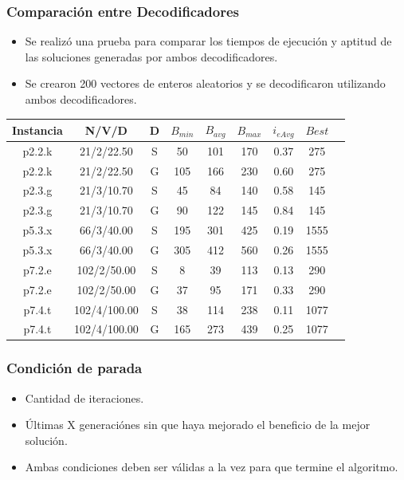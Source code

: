 \documentclass{beamer}
\begin{document}
\begin{frame}
\frametitle{Comparación entre Decodificadores}

\begin{itemize}
    \item Se realizó una prueba para comparar los tiempos de ejecución y aptitud de las soluciones generadas por ambos decodificadores.
    \pause
    \item Se crearon 200 vectores de enteros aleatorios y se decodificaron utilizando ambos decodificadores.
    \pause
\end{itemize}

\begin{table}
\begin{center}
\begin{tabular}{ |c|c|c|c|c|c|c|c|c| } 
\hline
Instancia & N/V/D & D & $B_{min}$ & $B_{avg}$ & $B_{max}$ & $i_{eAvg}$ & $Best$ \\
\hline
p2.2.k & 21/2/22.50 & S & 50 & 101 & 170 & 0.37 & 275 \\
p2.2.k & 21/2/22.50 & G & 105 & 166 & 230 & 0.60 & 275 \\
p2.3.g & 21/3/10.70 & S & 45 & 84 & 140 & 0.58 & 145 \\
p2.3.g & 21/3/10.70 & G & 90 & 122 & 145 & 0.84 & 145 \\
p5.3.x & 66/3/40.00 & S & 195 & 301 & 425 & 0.19 & 1555 \\
p5.3.x & 66/3/40.00 & G & 305 & 412 & 560 & 0.26 & 1555 \\
p7.2.e & 102/2/50.00 & S & 8 & 39 & 113 & 0.13 & 290 \\
p7.2.e & 102/2/50.00 & G & 37 & 95 & 171 & 0.33 & 290 \\
p7.4.t & 102/4/100.00 & S & 38 & 114 & 238 & 0.11 & 1077 \\
p7.4.t & 102/4/100.00 & G & 165 & 273 & 439 & 0.25 & 1077 \\
\hline
\end{tabular}
\end{center}
\label{tab:resultadosDecoSimple}
\end{table}


\end{frame}


\begin{frame}
\frametitle{Condición de parada}

\begin{itemize}
    \item Cantidad de iteraciones.
    \pause
    \item \'Ultimas X generaciónes sin que haya mejorado el beneficio de la mejor solución.
    \pause
    \item Ambas condiciones deben ser válidas a la vez para que termine el algoritmo.
\end{itemize}

\end{frame}
\end{document}
